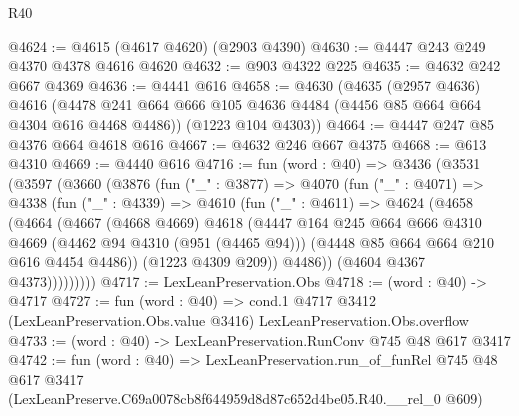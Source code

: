 \begin{lexlean}{R40}
\begin{coremodule}
@4624 := @4615 (@4617 @4620) (@2903 @4390)
@4630 := @4447 @243 @249 @4370 @4378 @4616 @4620
@4632 := @903 @4322 @225
@4635 := @4632 @242 @667 @4369
@4636 := @4441 @616
@4658 := @4630
    (@4635
      (@2957 @4636)
      @4616
      (@4478 @241 @664 @666 @105 @4636 @4484 (@4456 @85 @664 @664 @4304 @616 @4468 @4486))
      (@1223 @104 @4303))
@4664 := @4447 @247 @85 @4376 @664 @4618 @616
@4667 := @4632 @246 @667 @4375
@4668 := @613 @4310
@4669 := @4440 @616
@4716 := fun (word : @40) =>
  @3436
    (@3531
      (@3597
        (@3660
          (@3876
            (fun ("_" : @3877) =>
            @4070
              (fun ("_" : @4071) =>
              @4338
                (fun ("_" : @4339) =>
                @4610
                  (fun ("_" : @4611) =>
                  @4624
                    (@4658
                      (@4664
                        (@4667
                          (@4668 @4669)
                          @4618
                          (@4447
                            @164
                            @245
                            @664
                            @666
                            @4310
                            @4669
                            (@4462 @94 @4310 (@951 (@4465 @94)))
                            (@4448 @85 @664 @664 @210 @616 @4454 @4486))
                          (@1223 @4309 @209))
                        @4486))
                    (@4604 @4367 @4373)))))))))
@4717 := LexLeanPreservation.Obs
@4718 := (word : @40) -> @4717
@4727 := fun (word : @40) =>
  cond.{1} @4717 @3412 (LexLeanPreservation.Obs.value @3416) LexLeanPreservation.Obs.overflow
@4733 := (word : @40) -> LexLeanPreservation.RunConv @745 @48 @617 @3417
@4742 := fun (word : @40) =>
  LexLeanPreservation.run_of_funRel
    @745
    @48
    @617
    @3417
    (LexLeanPreserve.C69a0078cb8f644959d8d87c652d4be05.R40.__rel_0 @609)
\end{coremodule}
\end{lexlean}

